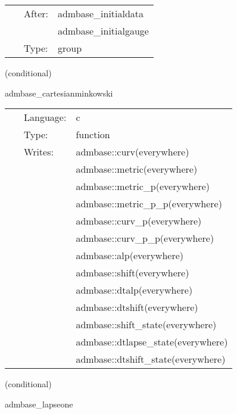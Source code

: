 \hspace{5mm}

 \begin{tabular*}{160mm}{cll} 
~ & After:  & admbase\_initialdata \\ 
~& ~ &admbase\_initialgauge\\ 
~ & Type:  & group \\ 
\end{tabular*} 


\vspace{5mm}

   (conditional) 

\hspace{5mm} admbase\_cartesianminkowski 

\hspace{5mm}{\it set the metric and extrinsic curvature to cartesian minkowski values } 


\hspace{5mm}

 \begin{tabular*}{160mm}{cll} 
~ & Language:  & c \\ 
~ & Type:  & function \\ 
~ & Writes:  & admbase::curv(everywhere) \\ 
~& ~ &admbase::metric(everywhere)\\ 
~& ~ &admbase::metric\_p(everywhere)\\ 
~& ~ &admbase::metric\_p\_p(everywhere)\\ 
~& ~ &admbase::curv\_p(everywhere)\\ 
~& ~ &admbase::curv\_p\_p(everywhere)\\ 
~& ~ &admbase::alp(everywhere)\\ 
~& ~ &admbase::shift(everywhere)\\ 
~& ~ &admbase::dtalp(everywhere)\\ 
~& ~ &admbase::dtshift(everywhere)\\ 
~& ~ &admbase::shift\_state(everywhere)\\ 
~& ~ &admbase::dtlapse\_state(everywhere)\\ 
~& ~ &admbase::dtshift\_state(everywhere)\\ 
\end{tabular*} 


\vspace{5mm}

   (conditional) 

\hspace{5mm} admbase\_lapseone 

